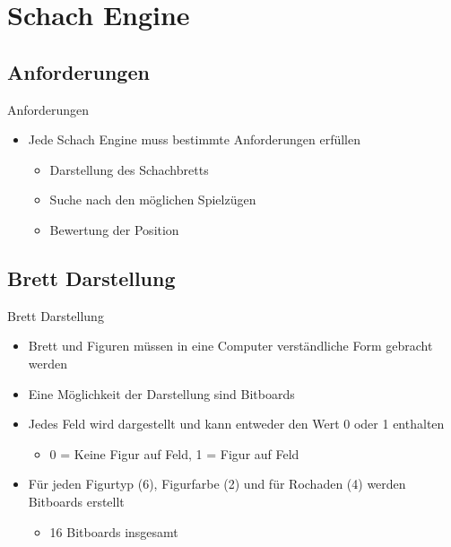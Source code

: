 \section{Schach Engine}

\subsection{Anforderungen}

\begin{frame}{Anforderungen}
\begin{itemize}
\item Jede Schach Engine muss bestimmte Anforderungen erfüllen
	\begin{itemize}
		\item Darstellung des Schachbretts
		\item Suche nach den möglichen Spielzügen
		\item Bewertung der Position
	\end{itemize}
\end{itemize}
\end{frame}

\subsection{Brett Darstellung}

\begin{frame}{Brett Darstellung}
\begin{itemize}
	\item Brett und Figuren müssen in eine Computer verständliche Form gebracht werden
	\item Eine Möglichkeit der Darstellung sind Bitboards
	\item Jedes Feld wird dargestellt und kann entweder den Wert 0 oder 1 enthalten
	\begin{itemize}
		\item 0 = Keine Figur auf Feld, 1 = Figur auf Feld
	\end{itemize}
	\item Für jeden Figurtyp (6), Figurfarbe (2) und für Rochaden (4) werden Bitboards erstellt
	\begin{itemize}
		\item 16 Bitboards insgesamt
	\end{itemize}
\end{itemize}
\end{frame}




